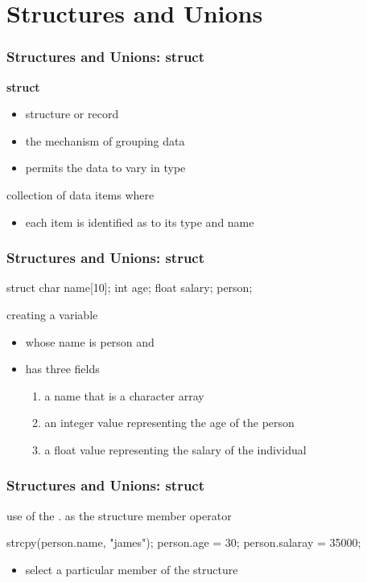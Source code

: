 \documentclass[newPxFont,sthlmFooter,nooffset]{beamer}
\begin{document}
\section{Structures and Unions}

\begin{frame}[t]
  \frametitle{Structures and Unions: struct}
\textbf{struct}  
\begin{itemize}
\item structure or record
\item the mechanism of grouping data
\item permits the data to vary in type
\end{itemize}
\bigskip

collection of data items where
\begin{itemize}
\item each item is identified as to its type and name
\end{itemize}

\end{frame}


\begin{frame}[t, fragile]
  \frametitle{Structures and Unions: struct}
\begin{codedef}
struct {
    char name[10];
    int age;
    float salary;
} person;
\end{codedef}
\bigskip
creating a variable
\begin{itemize}
\item whose name is person and
\item has three fields
  \begin{enumerate}
  \item a name that is a character array
  \item an integer value representing the age of the person
  \item a float value representing the salary of the individual
  \end{enumerate}

\end{itemize}

\end{frame}


\begin{frame}[t, fragile]
  \frametitle{Structures and Unions: struct}
use of the . as the structure member operator

\begin{codedef}
strcpy(person.name, "james");
person.age = 30;
person.salaray = 35000;  
\end{codedef}
\bigskip
\begin{itemize}
\item select a particular member of the structure
\end{itemize}

 
\end{frame}
\end{document}
